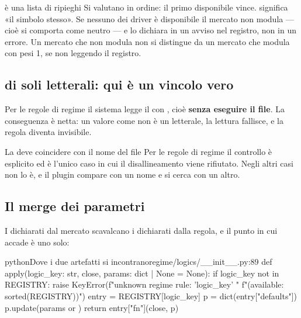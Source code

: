 \begin{nota}{ è una lista di ripieghi}
Si valutano in ordine: il primo disponibile vince.  significa «il
simbolo stesso». Se nessuno dei driver è disponibile il mercato non modula
--- cioè si comporta come neutro --- e lo dichiara in un avviso nel registro,
non in un errore. Un mercato che non modula non si distingue da un mercato
che modula con pesi \num{1}, se non leggendo il registro.
\end{nota}

\subsection{ di soli letterali: qui è un vincolo vero}

Per le regole di regime il sistema legge il  con
, cioè \textbf{senza eseguire il file}. La
conseguenza è netta: un valore come  non è un letterale, la
lettura fallisce, e la regola diventa invisibile.

\begin{attenzione}{La  deve coincidere con il nome del file}
Per le regole di regime il controllo è esplicito ed è l'unico caso in cui il
disallineamento viene rifiutato. Negli altri casi non lo è, e il plugin
compare con un nome e si cerca con un altro.
\end{attenzione}

\subsection{Il merge dei parametri}

I  dichiarati dal mercato scavalcano i  dichiarati
dalla regola, e il punto in cui accade è uno solo:

\begin{codiceInterno}{python}{Dove i due artefatti si incontrano}{regime/logics/\_\_init\_\_.py:89}
def apply(logic_key: str, close, params: dict | None = None):
    if logic_key not in REGISTRY:
        raise KeyError(f"unknown regime rule: '{logic_key}' "
                       f"(available: {sorted(REGISTRY)})")
    entry = REGISTRY[logic_key]
    p = dict(entry["defaults"])
    p.update(params or {})
    return entry["fn"](close, p)
\end{codiceInterno}

